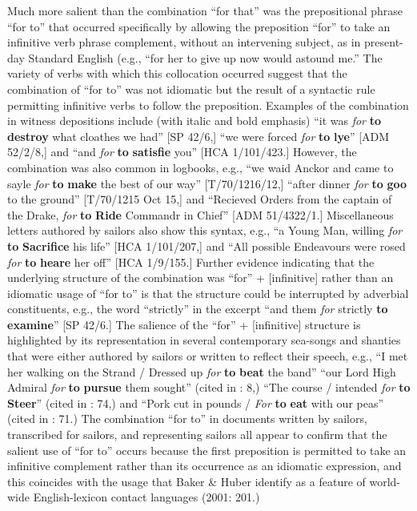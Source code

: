 Much more salient than the combination “for that” was the prepositional phrase “for to” that occurred specifically by allowing the preposition “for” to take an infinitive verb phrase complement, without an intervening subject, as in present-day Standard English (e.g., “for her to give up now would astound me.” The variety of verbs with which this collocation occurred suggest that the combination of “for to” was not idiomatic but the result of a syntactic rule permitting infinitive verbs to follow the preposition. Examples of the combination in witness depositions include (with italic and bold emphasis) “it was \textit{for} \textbf{to} \textbf{destroy} what cloathes we had” [SP 42/6,] “we were forced \textit{for} \textbf{to} \textbf{lye}” [ADM 52/2/8,] and “and \textit{for} \textbf{to} \textbf{satisfie} you” [HCA 1/101/423.] However, the combination was also common in logbooks, e.g., “we waid Anckor and came to sayle \textit{for} \textbf{to} \textbf{make} the best of our way” [T/70/1216/12,] “after dinner \textit{for} \textbf{to} \textbf{goo} to the ground” [T/70/1215 Oct 15,] and “Recieved Orders from the captain of the Drake, \textit{for} \textbf{to} \textbf{Ride} Commandr in Chief” [ADM 51/4322/1.] Miscellaneous letters authored by sailors also show this syntax, e.g., “a Young Man, willing \textit{for} \textbf{to} \textbf{Sacrifice} his life” [HCA 1/101/207,] and “All possible Endeavours were rosed \textit{for} \textbf{to} \textbf{heare} her off” [HCA 1/9/155.] Further evidence indicating that the underlying structure of the combination was “for” + [infinitive] rather than an idiomatic usage of “for to” is that the structure could be interrupted by adverbial constituents, e.g., the word “strictly” in the excerpt “and them \textit{for} strictly \textbf{to} \textbf{examine}” [SP 42/6.] The salience of the “for” + [infinitive] structure is highlighted by its representation in several contemporary sea-songs and shanties that were either authored by sailors or written to reflect their speech, e.g., “I met her walking on the Strand / Dressed up \textit{for} \textbf{to} \textbf{beat} the band” \citep[51,]{Hugill1969} “our Lord High Admiral \textit{for} \textbf{to} \textbf{pursue} them sought” (cited in \citealt{Palmer1986}: 8,) “The course / intended \textit{for} \textbf{to} \textbf{Steer}” (cited in \citealt{Palmer1986}: 74,) and “Pork cut in pounds / \textit{For} \textbf{to} \textbf{eat} with our peas” (cited in \citealt{Palmer1986}: 71.) The combination “for to” in documents written by sailors, transcribed for sailors, and representing sailors all appear to confirm that the salient use of “for to” occurs because the first preposition is permitted to take an infinitive complement rather than its occurrence as an idiomatic expression, and this coincides with the usage that Baker \& Huber identify as a feature of world-wide English-lexicon contact languages (2001: 201.) 

